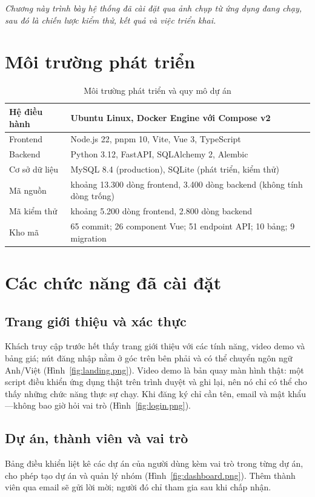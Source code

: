 \documentclass[../main.tex]{subfiles}
\begin{document}
\textit{Chương này trình bày hệ thống đã cài đặt qua ảnh chụp từ ứng dụng đang chạy, sau đó là chiến
lược kiểm thử, kết quả và việc triển khai.}

\section{Môi trường phát triển}
\begin{table}[H]
\centering
\caption{Môi trường phát triển và quy mô dự án}\label{tab:env}
\renewcommand{\arraystretch}{1.2}
\begin{tabular}{|p{5cm}|p{8.7cm}|}
\hline
Hệ điều hành & Ubuntu Linux, Docker Engine với Compose v2 \\ \hline
Frontend & Node.js 22, pnpm 10, Vite, Vue 3, TypeScript \\ \hline
Backend & Python 3.12, FastAPI, SQLAlchemy 2, Alembic \\ \hline
Cơ sở dữ liệu & MySQL 8.4 (production), SQLite (phát triển, kiểm thử) \\ \hline
Mã nguồn & khoảng 13.300 dòng frontend, 3.400 dòng backend (không tính dòng trống) \\ \hline
Mã kiểm thử & khoảng 5.200 dòng frontend, 2.800 dòng backend \\ \hline
Kho mã & 65 commit; 26 component Vue; 51 endpoint API; 10 bảng; 9 migration \\ \hline
\end{tabular}
\end{table}

\section{Các chức năng đã cài đặt}
\subsection{Trang giới thiệu và xác thực}
Khách truy cập trước hết thấy trang giới thiệu với các tính năng, video demo và bảng giá; nút đăng
nhập nằm ở góc trên bên phải và có thể chuyển ngôn ngữ Anh/Việt (Hình~\ref{fig:landing.png}). Video
demo là bản quay màn hình thật: một script điều khiển ứng dụng thật trên trình duyệt và ghi lại, nên
nó chỉ có thể cho thấy những chức năng thực sự chạy. Khi đăng ký chỉ cần tên, email và mật khẩu---không
bao giờ hỏi vai trò (Hình~\ref{fig:login.png}).


\subsection{Dự án, thành viên và vai trò}
Bảng điều khiển liệt kê các dự án của người dùng kèm vai trò trong từng dự án, cho phép tạo dự án và
quản lý nhóm (Hình~\ref{fig:dashboard.png}). Thêm thành viên qua email sẽ gửi lời mời; người đó chỉ
tham gia sau khi chấp nhận.
\end{document}
